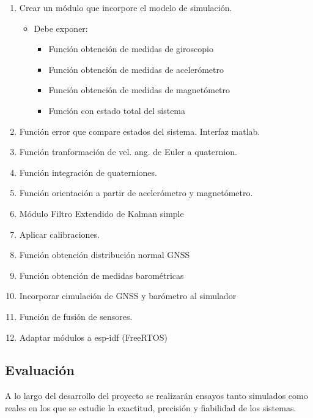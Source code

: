 \documentclass{sty/propuesta}
\begin{document}
\begin{enumerate}
    \item Crear un módulo que incorpore el modelo de simulación.
        \begin{itemize}
            \item  Debe exponer:
            \begin{itemize}
                \item Función obtención de medidas de giroscopio
                \item Función obtención de medidas de acelerómetro
                \item Función obtención de medidas de magnetómetro
                \item Función con estado total del sistema
            \end{itemize}
        \end{itemize}
        
    \item Función error que compare estados del sistema. Interfaz matlab.
    \item Función tranformación de vel. ang. de Euler a quaternion.
    \item Función integración de quaterniones.
    \item Función orientación a partir de acelerómetro y magnetómetro. \cite{BibEntry2024Oct}
    \item Módulo Filtro Extendido de Kalman simple
    \item Aplicar calibraciones.
    \item Función obtención distribución normal GNSS
    \item Función obtención de medidas barométricas
    \item Incorporar cimulación de GNSS y barómetro al simulador
    \item Función de fusión de sensores.
    \item Adaptar módulos a esp-idf (FreeRTOS) \cite{espressif_idf_programming_guide}
    
    
\end{enumerate}

\subsection{Evaluación}

A lo largo del desarrollo del proyecto se realizarán ensayos tanto simulados como reales en los que se estudie la exactitud, precisión y fiabilidad de los sistemas.
\end{document}
